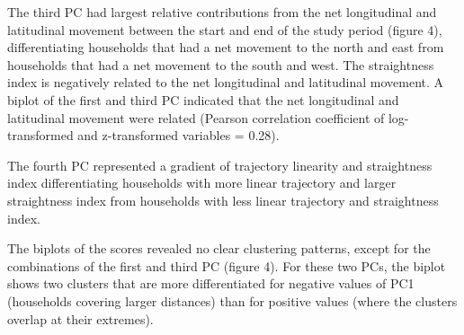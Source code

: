 \documentclass[]{elsarticle} %
\begin{document}
The third PC had largest relative contributions from the net
longitudinal and latitudinal movement between the start and end of the
study period (figure 4), differentiating households that had a net
movement to the north and east from households that had a net movement
to the south and west. The straightness index is negatively related to
the net longitudinal and latitudinal movement. A biplot of the first and
third PC indicated that the net longitudinal and latitudinal movement
were related (Pearson correlation coefficient of log-transformed and
z-transformed variables = 0.28).

The fourth PC represented a gradient of trajectory linearity and
straightness index differentiating households with more linear
trajectory and larger straightness index from households with less
linear trajectory and straightness index.

The biplots of the scores revealed no clear clustering patterns, except
for the combinations of the first and third PC (figure 4). For these two
PCs, the biplot shows two clusters that are more differentiated for
negative values of PC1 (households covering larger distances) than for
positive values (where the clusters overlap at their extremes).
\end{document}
